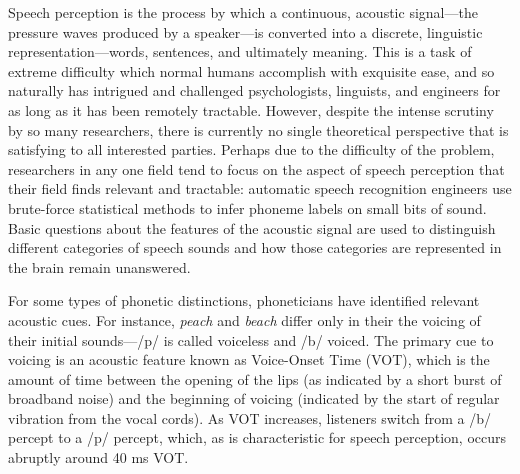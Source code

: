 \documentclass[12pt]{article}
\begin{document}
Speech perception is the process by which a continuous, acoustic signal---the pressure waves produced by a speaker---is converted into a discrete, linguistic representation---words, sentences, and ultimately meaning.  This is a task of extreme difficulty which normal humans accomplish with exquisite ease, and so naturally has intrigued and challenged psychologists, linguists, and engineers for as long as it has been remotely tractable.  However, despite the intense scrutiny by so many researchers, there is currently no single theoretical perspective that is satisfying to all interested parties.  Perhaps due to the difficulty of the problem, researchers in any one field tend to focus on the aspect of speech perception that their field finds relevant and tractable: automatic speech recognition engineers use brute-force statistical methods to infer phoneme labels on small bits of sound.  Basic questions about the features of the acoustic signal are used to distinguish different categories of speech sounds and how those categories are represented in the brain remain unanswered.

For some types of phonetic distinctions, phoneticians have identified relevant acoustic cues.  For instance, \emph{peach} and \emph{beach} differ only in their the voicing of their initial sounds---/p/ is called voiceless and /b/ voiced.  The primary cue to voicing is an acoustic feature known as Voice-Onset Time (VOT), which is the amount of time between the opening of the lips (as indicated by a short burst of broadband noise) and the beginning of voicing (indicated by the start of regular vibration from the vocal cords).  As VOT increases, listeners switch from a /b/ percept to a /p/ percept, which, as is characteristic for speech perception, occurs abruptly around 40 ms VOT.

\end{document}
